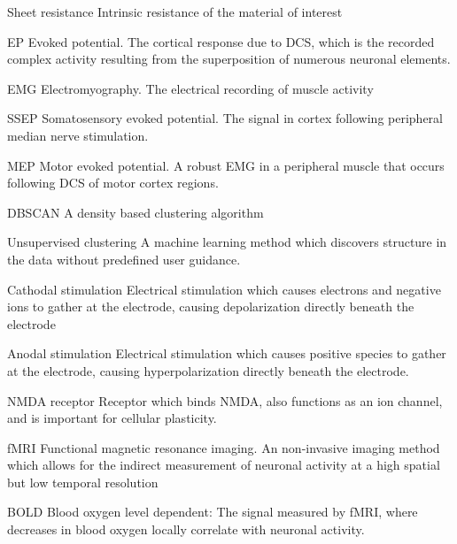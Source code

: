 \begin{glossary}
\item[Sheet resistance] Intrinsic resistance of the material of interest 
\item[EP] Evoked potential. The cortical response due to DCS, which is the recorded complex activity resulting from the superposition of numerous neuronal elements. 
\item[EMG] Electromyography. The electrical recording of muscle activity
\item[SSEP] Somatosensory evoked potential. The signal in cortex following peripheral median nerve stimulation. 
\item[MEP] Motor evoked potential. A robust EMG in a peripheral muscle that occurs following DCS of motor cortex regions. 
\item[DBSCAN] A density based clustering algorithm 
\item[Unsupervised clustering] A machine learning method which discovers structure in the data without predefined user guidance. 
\item[Cathodal stimulation] Electrical stimulation which causes electrons and negative ions to gather at the electrode, causing depolarization directly beneath the electrode
\item[Anodal stimulation] Electrical stimulation which causes positive species to gather at the electrode, causing hyperpolarization directly beneath the electrode. 
\item[NMDA receptor] Receptor which binds NMDA, also functions as an ion channel, and is important for cellular plasticity. 
\item[fMRI] Functional magnetic resonance imaging. An non-invasive imaging method which allows for the indirect measurement of neuronal activity at a high spatial but low temporal resolution
\item[BOLD] Blood oxygen level dependent: The signal measured by fMRI, where decreases in blood oxygen locally correlate with neuronal activity. 



 
\end{glossary}
 
